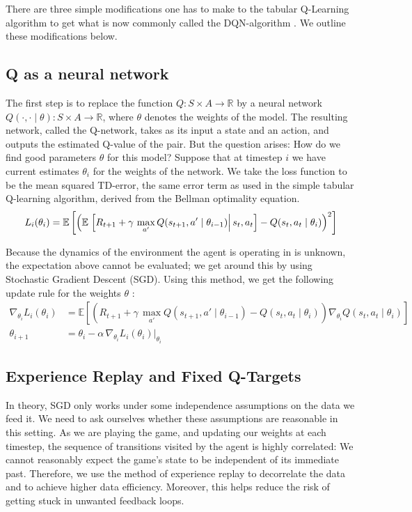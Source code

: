 There are three simple modifications one has to make to the tabular Q-Learning algorithm to get what 
is now commonly called the DQN-algorithm \cite{mnih2013playing}. We outline these modifications below. 

\subsection{Q as a neural network}
The first step is to replace the function $Q:S\times A \rightarrow \mathbb{R}$ by a neural network \linebreak
${Q(\cdot, \cdot \mid \theta):S \times A \rightarrow \mathbb{R}}$, where $\theta$ denotes the weights of the model.
The resulting network, called 
the Q-network, takes as its input a state and an action, and outputs the estimated Q-value of the 
pair. But the question arises: How do we find good parameters $\theta$ for this model? Suppose that
 at timestep $i$ we have current estimates $\theta_i$ for the weights of the network. We take the loss function to be the mean squared TD-error, the same error term as used in the simple 
 tabular Q-learning algorithm, derived from the Bellman optimality equation. 
\begin{align}
L_i(\theta_i) = \mathbb{E} \left[ \left( \mathbb{E}\left.\left[ R_{t+1} + \gamma\, \max\limits_{a'} Q(s_{t+1}, a' \mid \theta_{i-1}) \right| s_t, a_t \right] - Q(s_t, a_t \mid \theta_i) \right)^2 \right]
\end{align}

Because the dynamics of the environment the agent is operating in is unknown, the expectation above cannot be evaluated;
we get around this by using Stochastic
Gradient Descent (SGD). Using this method,
we get the following update rule for the weights $\theta$ :
\begin{align}
\nabla_{\theta_i} L_i (\theta_i) &= \mathbb{E} \left[ \left(R_{t+1} + \gamma\, \max\limits_{a'} Q(s_{t+1}, a' \mid \theta_{i-1}) - Q(s_t, a_t \mid \theta_i) \right) \nabla_{\theta_i} Q(s_t, a_t \mid \theta_i ) \right] \\
\theta_{i+1} &= \theta_i - \alpha\, \nabla_{\theta_i} L_i (\theta_i) \rvert _{\theta_i}
\end{align}

\subsection{Experience Replay and Fixed Q-Targets}
In theory, SGD only works under some independence assumptions on the data 
we feed it. We need to ask ourselves whether these assumptions are reasonable in this setting. As 
we are playing the game, and updating our weights at each timestep, the sequence of transitions 
visited by the agent is highly correlated: We cannot reasonably expect the game's state to be independent
of its immediate past. Therefore, we use the method of experience replay to decorrelate the data and  
to achieve higher data efficiency. Moreover, this helps 
reduce the risk of getting stuck  in unwanted feedback loops. 

